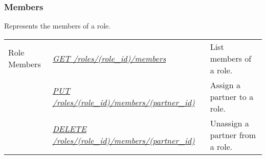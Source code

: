 \documentclass[letterpaper,10pt,english]{sphinxmanual}
\begin{document}
\subsubsection{Members}
\label{\detokenize{resources/role:members}}
Represents the members of a role.

\noindent\begin{tabulary}{\linewidth}{|L|L|L|}
\hline
{}\relax &\relax &\relax \\
\hline
Role Members
&
{\hyperref[\detokenize{resources/role:get--roles-(role_id)-members}]{\emph{GET /roles/(role\_id)/members}}}
&
List members of a role.
\\
\hline&
{\hyperref[\detokenize{resources/role:put--roles-(role_id)-members-(partner_id)}]{\emph{PUT /roles/(role\_id)/members/(partner\_id)}}}
&
Assign a partner to a role.
\\
\hline&
{\hyperref[\detokenize{resources/role:delete--roles-(role_id)-members-(partner_id)}]{\emph{DELETE /roles/(role\_id)/members/(partner\_id)}}}
&
Unassign a partner from a role.
\\
\hline\end{tabulary}


\begin{DUlineblock}{0em}
\item[] 
\end{DUlineblock}
\end{document}
